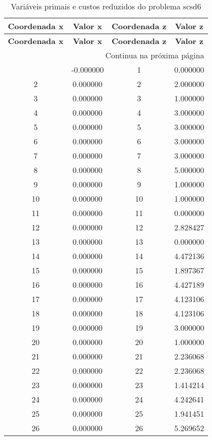 \documentclass[12pt]{article}
\begin{document}
\begin{longtable}{@{}cccc@{}}
\caption{Variáveis primais e custos reduzidos do problema scsd6} \\
\toprule
\textbf{Coordenada x} & \textbf{Valor x} & \textbf{Coordenada z} & \textbf{Valor z} \\
\midrule
\endfirsthead

\toprule
\textbf{Coordenada x} & \textbf{Valor x} & \textbf{Coordenada z} & \textbf{Valor z} \\
\midrule
\endhead

\midrule \multicolumn{4}{r}{{Continua na próxima página}} \\ \midrule
\endfoot

\bottomrule
\endlastfoot
1 & -0.000000 & 1 & 0.000000 \\
2 & 0.000000 & 2 & 2.000000 \\
3 & 0.000000 & 3 & 1.000000 \\
4 & 0.000000 & 4 & 3.000000 \\
5 & 0.000000 & 5 & 3.000000 \\
6 & 0.000000 & 6 & 3.000000 \\
7 & 0.000000 & 7 & 3.000000 \\
8 & 0.000000 & 8 & 5.000000 \\
9 & 0.000000 & 9 & 1.000000 \\
10 & 0.000000 & 10 & 1.000000 \\
11 & 0.000000 & 11 & 0.000000 \\
12 & 0.000000 & 12 & 2.828427 \\
13 & 0.000000 & 13 & 0.000000 \\
14 & 0.000000 & 14 & 4.472136 \\
15 & 0.000000 & 15 & 1.897367 \\
16 & 0.000000 & 16 & 4.427189 \\
17 & 0.000000 & 17 & 4.123106 \\
18 & 0.000000 & 18 & 4.123106 \\
19 & 0.000000 & 19 & 3.000000 \\
20 & 0.000000 & 20 & 1.000000 \\
21 & 0.000000 & 21 & 2.236068 \\
22 & 0.000000 & 22 & 2.236068 \\
23 & 0.000000 & 23 & 1.414214 \\
24 & 0.000000 & 24 & 4.242641 \\
25 & 0.000000 & 25 & 1.941451 \\
26 & 0.000000 & 26 & 5.269652 \\

\end{longtable}
\end{document}
